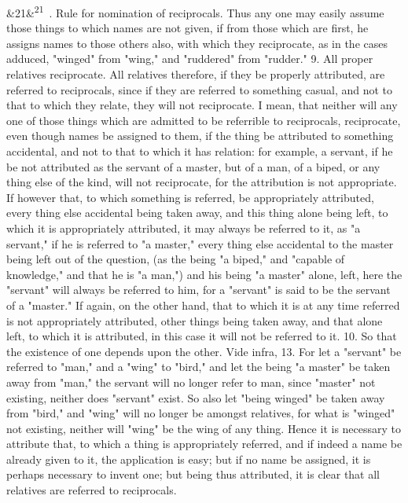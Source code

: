 \documentclass[12pt]{article}
\newcommand{\para}[1][]{\par\noindent\ifx&#1&\else\textsuperscript{\footnotesize #1}~\fi}
\begin{document}
\para[21] 8. Rule for nomination of reciprocals. Thus any one may easily assume those things to which names are not given, if from those which are first, he assigns names to those others also, with which they reciprocate, as in the cases adduced, "winged" from "wing," and "ruddered" from "rudder." 9. All proper relatives reciprocate. All relatives therefore, if they be properly attributed, are referred to reciprocals, since if they are referred to something casual, and not to that to which they relate, they will not reciprocate. I mean, that neither will any one of those things which are admitted to be referrible to reciprocals, reciprocate, even though names be assigned to them, if the thing be attributed to something accidental, and not to that to which it has relation: for example, a servant, if he be not attributed as the servant of a master, but of a man, of a biped, or any thing else of the kind, will not reciprocate, for the attribution is not appropriate. If however that, to which something is referred, be appropriately attributed, every thing else accidental being taken away, and this thing alone being left, to which it is appropriately attributed, it may always be referred to it, as "a servant," if he is referred to "a master," every thing else accidental to the master being left out of the question, (as the being "a biped," and "capable of knowledge," and that he is "a man,") and his being "a master" alone, left, here the "servant" will always be referred to him, for a "servant" is said to be the servant of a "master." If again, on the other hand, that to which it is at any time referred is not appropriately attributed, other things being taken away, and that alone left, to which it is attributed, in this case it will not be referred to it. 10. So that the existence of one depends upon the other. Vide infra, 13. For let a "servant" be referred to "man," and a "wing" to "bird," and let the being "a master" be taken away from "man," the servant will no longer refer to man, since "master" not existing, neither does "servant" exist. So also let "being winged" be taken away from "bird," and "wing" will no longer be amongst relatives, for what is "winged" not existing, neither will "wing" be the wing of any thing. Hence it is necessary to attribute that, to which a thing is appropriately referred, and if indeed a name be already given to it, the application is easy; but if no name be assigned, it is perhaps necessary to invent one; but being thus attributed, it is clear that all relatives are referred to reciprocals.
\end{document}
